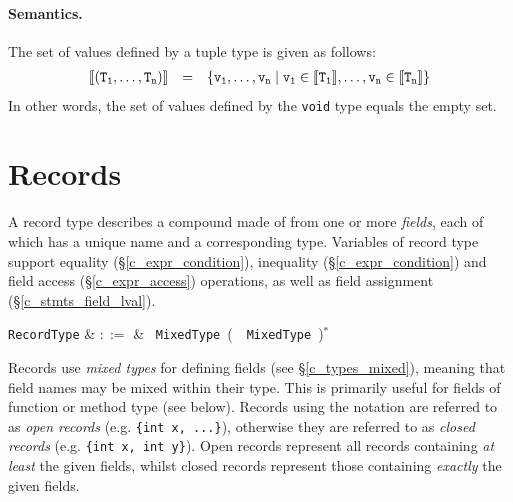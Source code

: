 \paragraph{Semantics.}  The set of values defined by a tuple type is given as follows:
\begin{displaymath}
\begin{array}{rcl}
{\tt \llbracket(T_1, \ldots, T_n)\rrbracket} & = & {\tt\{ v_1,\ldots,v_n\;|\;v_1\in\llbracket T_1\rrbracket, \ldots, v_n\in\llbracket T_n\rrbracket\}}\\
\end{array}
\end{displaymath}
In other words, the set of values defined by the \lstinline{void} type
equals the empty set.  


\section{Records}
\label{c_types_record}

A record type describes a compound made of from one or more {\em fields}, each of which has a unique name and a corresponding type.  Variables of record type support equality (\S\ref{c_expr_condition}), inequality (\S\ref{c_expr_condition}) and field access (\S\ref{c_expr_access}) operations, as well as field assignment (\S\ref{c_stmts_field_lval}).

\begin{syntax}
  \verb+RecordType+ & $::=$ & \token{\{}\ \verb+MixedType+\
  \big(\ \token{,}\ \verb+MixedType+\
  \big)$^*$ \ \token{\}}\\
\end{syntax}

Records use {\em mixed types} for defining fields (see \S\ref{c_types_mixed}), meaning that field names may be mixed within their type.  This is primarily useful for fields of function or method type (see below).  Records using the  notation are referred to as {\em open records} (e.g. \lstinline|{int x, ...}|), otherwise they are referred to as {\em closed records} (e.g. \lstinline|{int x, int y}|).  Open records represent all records containing {\em at least} the given fields, whilst closed records represent those containing {\em exactly} the given fields.   

